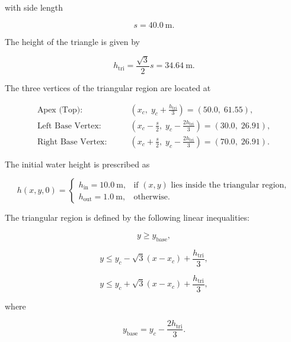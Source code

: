 \documentclass[12pt]{article}
\begin{document}
with side length

\begin{equation}
s=40.0~\mathrm{m}.
\end{equation}

The height of the triangle is given by

\begin{equation}
h_{\mathrm{tri}}
=
\frac{\sqrt{3}}{2}s
=
34.64~\mathrm{m}.
\end{equation}

The three vertices of the triangular region are located at

\begin{align}
\text{Apex (Top):}\qquad
&(x_c,\; y_c+\tfrac{h_{\mathrm{tri}}}{3})
=(50.0,\;61.55), \\
\text{Left Base Vertex:}\qquad
&(x_c-\tfrac{s}{2},\;
y_c-\tfrac{2h_{\mathrm{tri}}}{3})
=(30.0,\;26.91), \\
\text{Right Base Vertex:}\qquad
&(x_c+\tfrac{s}{2},\;
y_c-\tfrac{2h_{\mathrm{tri}}}{3})
=(70.0,\;26.91).
\end{align}

The initial water height is prescribed as

\begin{equation}
h(x,y,0)=
\begin{cases}
h_{\mathrm{in}}=10.0~\mathrm{m},
& \text{if } (x,y) \text{ lies inside the triangular region},\\
h_{\mathrm{out}}=1.0~\mathrm{m},
& \text{otherwise}.
\end{cases}
\end{equation}

The triangular region is defined by the following linear inequalities:

\begin{equation}
y \geq y_{\mathrm{base}},
\end{equation}

\begin{equation}
y \leq
y_c-\sqrt{3}(x-x_c)
+\frac{h_{\mathrm{tri}}}{3},
\end{equation}

\begin{equation}
y \leq
y_c+\sqrt{3}(x-x_c)
+\frac{h_{\mathrm{tri}}}{3},
\end{equation}

where

\begin{equation}
y_{\mathrm{base}}
=
y_c-\frac{2h_{\mathrm{tri}}}{3}.
\end{equation}
\end{document}
